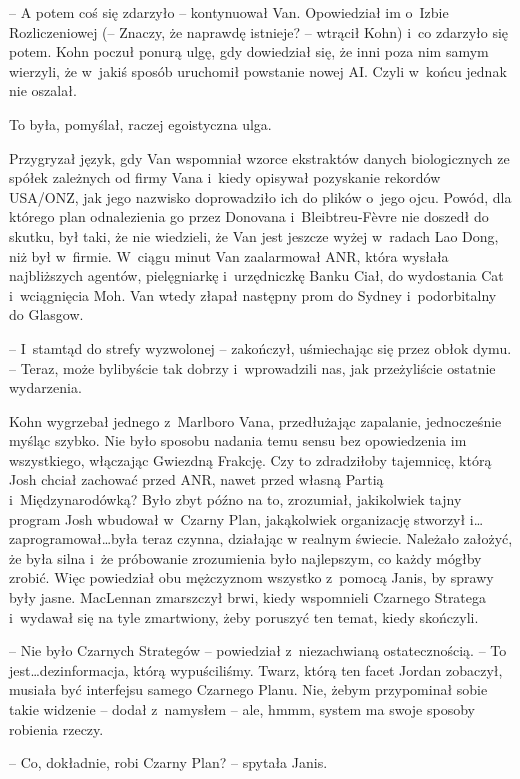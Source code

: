\documentclass[oneside,polish,11pt,sfheadings]{mwbk}
\begin{document}
-- A potem coś się zdarzyło -- kontynuował Van. Opowiedział im o~Izbie
Rozliczeniowej (-- Znaczy, że naprawdę istnieje? -- wtrącił Kohn) i~co
zdarzyło się potem. Kohn poczuł ponurą ulgę, gdy dowiedział się, że inni
poza nim samym wierzyli, że w~jakiś sposób uruchomił powstanie nowej AI.
Czyli w~końcu jednak nie oszalał.

To była, pomyślał, raczej egoistyczna ulga.

Przygryzał język, gdy Van wspomniał wzorce ekstraktów danych
biologicznych ze spółek zależnych od firmy Vana i~kiedy opisywał
pozyskanie rekordów USA/ONZ, jak jego nazwisko doprowadziło ich do
plików o~jego ojcu. Powód, dla którego plan odnalezienia go przez
Donovana i~Bleibtreu-Fèvre nie doszedł do skutku, był taki, że nie
wiedzieli, że Van jest jeszcze wyżej w~radach Lao Dong, niż był w~firmie. W~ciągu minut Van zaalarmował ANR, która wysłała najbliższych
agentów, pielęgniarkę i~urzędniczkę Banku Ciał, do wydostania Cat i~wciągnięcia Moh. Van wtedy złapał następny prom do Sydney i~podorbitalny
do Glasgow.

-- I~stamtąd do strefy wyzwolonej -- zakończył, uśmiechając się przez
obłok dymu. -- Teraz, może bylibyście tak dobrzy i~wprowadzili nas, jak
przeżyliście ostatnie wydarzenia.

Kohn wygrzebał jednego z~Marlboro Vana, przedłużając zapalanie,
jednocześnie myśląc szybko. Nie było sposobu nadania temu sensu bez
opowiedzenia im wszystkiego, włączając Gwiezdną Frakcję. Czy to
zdradziłoby tajemnicę, którą Josh chciał zachować przed ANR, nawet przed
własną Partią i~Międzynarodówką? Było zbyt późno na to, zrozumiał,
jakikolwiek tajny program Josh wbudował w~Czarny Plan, jakąkolwiek
organizację stworzył i\ldots zaprogramował\ldots była teraz czynna, działając
w realnym świecie. Należało założyć, że była silna i~że próbowanie
zrozumienia było najlepszym, co każdy mógłby zrobić. Więc powiedział obu
mężczyznom wszyst\-ko z~pomocą Janis, by sprawy były jasne. MacLennan
zmarszczył brwi, kiedy wspomnieli Czarnego Stratega i~wydawał się na
tyle zmartwiony, żeby poruszyć ten temat, kiedy skończyli.

-- Nie było Czarnych Strategów -- powiedział z~niezachwianą
ostatecznością. -- To jest\ldots dezinformacja, którą wypuściliśmy. Twarz,
którą ten facet Jordan zobaczył, musiała być interfejsu samego Czarnego
Planu. Nie, żebym przypominał sobie takie widzenie -- dodał z~namysłem -- ale, hmmm, system ma swoje sposoby robienia rzeczy.

-- Co, dokładnie, robi Czarny Plan? -- spytała Janis.
\end{document}
